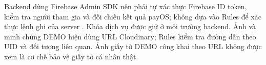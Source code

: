 Backend dùng Firebase Admin SDK nên phải tự xác thực Firebase ID token, kiểm tra người tham gia và đối chiếu kết quả payOS; không dựa vào Rules để xác thực lệnh ghi của server \parencite{firebase_rules_conditions}. Khóa dịch vụ được giữ ở môi trường backend. Ảnh và minh chứng DEMO hiện dùng URL Cloudinary; Rules kiểm tra đường dẫn theo UID và đối tượng liên quan. Ảnh giấy tờ DEMO công khai theo URL không được xem là cơ chế bảo vệ giấy tờ cá nhân thật.

\endgroup
